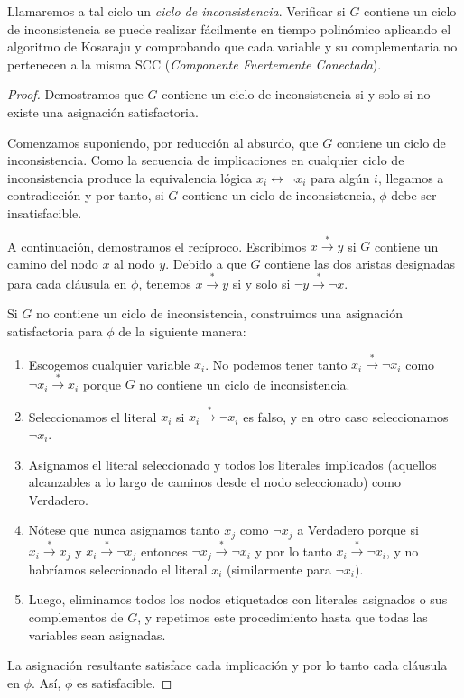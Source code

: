 \documentclass[a4paper,12pt]{article}
\begin{document}
Llamaremos a tal ciclo un \textit{ciclo de inconsistencia}. Verificar si $G$ contiene un ciclo de inconsistencia se puede realizar fácilmente en tiempo polinómico aplicando el algoritmo de Kosaraju y comprobando que cada variable y su complementaria no pertenecen a la misma SCC (\textit{Componente Fuertemente Conectada}).

\begin{proof}

Demostramos que $G$ contiene un ciclo de inconsistencia si y solo si no existe una asignación satisfactoria. 

Comenzamos suponiendo, por reducción al absurdo, que $G$ contiene un ciclo de inconsistencia. Como la secuencia de implicaciones en cualquier ciclo de inconsistencia produce la equivalencia lógica $x_i \leftrightarrow \neg x_i$ para algún $i$, llegamos a contradicción y por tanto, si $G$ contiene un ciclo de inconsistencia, $\phi$ debe ser insatisfacible.

A continuación, demostramos el recíproco. Escribimos $x \stackrel{*}{\rightarrow} y$ si $G$ contiene un camino del nodo $x$ al nodo $y$. Debido a que $G$ contiene las dos aristas designadas para cada cláusula en $\phi$, tenemos $x \stackrel{*}{\rightarrow} y$ si y solo si $\neg y \stackrel{*}{\rightarrow} \neg x$.

Si $G$ no contiene un ciclo de inconsistencia, construimos una asignación satisfactoria para $\phi$ de la siguiente manera:

\begin{enumerate}
    \item Escogemos cualquier variable $x_i$. No podemos tener tanto $x_i \stackrel{*}{\rightarrow} \neg x_i$ como $\neg x_i \stackrel{*}{\rightarrow} x_i$ porque $G$ no contiene un ciclo de inconsistencia.
    
    \item Seleccionamos el literal $x_i$ si $x_i \stackrel{*}{\rightarrow} \neg x_i$ es falso, y en otro caso seleccionamos $\neg x_i$.
    
    \item Asignamos el literal seleccionado y todos los literales implicados (aquellos alcanzables a lo largo de caminos desde el nodo seleccionado) como Verdadero.
    
    \item Nótese que nunca asignamos tanto $x_j$ como $\neg x_j$ a Verdadero porque si $x_i \stackrel{*}{\rightarrow} x_j$ y $x_i \stackrel{*}{\rightarrow} \neg x_j$ entonces $\neg x_j \stackrel{*}{\rightarrow} \neg x_i$ y por lo tanto $x_i \stackrel{*}{\rightarrow} \neg x_i$, y no habríamos seleccionado el literal $x_i$ (similarmente para $\neg x_i$).
    
    \item Luego, eliminamos todos los nodos etiquetados con literales asignados o sus complementos de $G$, y repetimos este procedimiento hasta que todas las variables sean asignadas.
\end{enumerate}

La asignación resultante satisface cada implicación y por lo tanto cada cláusula en $\phi$. Así, $\phi$ es satisfacible.

\end{proof}
\end{document}
